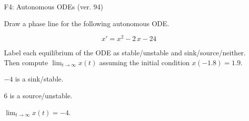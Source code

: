 \begin{exercise}
  \begin{exerciseTitle}F4: Autonomous ODEs (ver. 94)\end{exerciseTitle}
  \begin{exerciseStatement}
    

      Draw a phase line for the following 
      autonomous ODE.
    

    
\[x'= x^{2} - 2 \, x - 24\]

    

      Label each equilibrium of the ODE
      as stable/unstable and sink/source/neither.
      Then compute \(\lim_{t\to\infty}x(t)\)
      assuming the initial condition
      \(x( -1.8 )= 1.9\).
    

  \end{exerciseStatement}
  \begin{exerciseAnswer}
    

      \(-4\) is a sink/stable.
      
      \(6\) is a source/unstable.
    

    

      \(\lim_{t\to\infty}x(t)=-4\).
    

  \end{exerciseAnswer}
\end{exercise}